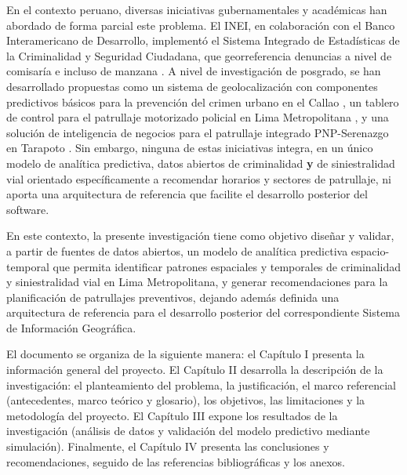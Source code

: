 \documentclass[12pt,letterpaper]{report}
\begin{document}
En el contexto peruano, diversas iniciativas gubernamentales y acad\'emicas han abordado de forma parcial este problema. El INEI, en colaboraci\'on con el Banco Interamericano de Desarrollo, implement\'o el Sistema Integrado de Estad\'isticas de la Criminalidad y Seguridad Ciudadana, que georreferencia denuncias a nivel de comisar\'ia e incluso de manzana \citep{bid2020buenapractica}. A nivel de investigaci\'on de posgrado, se han desarrollado propuestas como un sistema de geolocalizaci\'on con componentes predictivos b\'asicos para la prevenci\'on del crimen urbano en el Callao \citep{talla2025geolocalizacion}, un tablero de control para el patrullaje motorizado policial en Lima Metropolitana \citep{sanchezguevara2022tabcop}, y una soluci\'on de inteligencia de negocios para el patrullaje integrado PNP-Serenazgo en Tarapoto \citep{flores2017patrullaje}. Sin embargo, ninguna de estas iniciativas integra, en un \'unico modelo de analítica predictiva, datos abiertos de criminalidad \textbf{y} de siniestralidad vial orientado espec\'ificamente a recomendar horarios y sectores de patrullaje, ni aporta una arquitectura de referencia que facilite el desarrollo posterior del software.

En este contexto, la presente investigaci\'on tiene como objetivo dise\~nar y validar, a partir de fuentes de datos abiertos, un modelo de analítica predictiva espacio-temporal que permita identificar patrones espaciales y temporales de criminalidad y siniestralidad vial en Lima Metropolitana, y generar recomendaciones para la planificaci\'on de patrullajes preventivos, dejando adem\'as definida una arquitectura de referencia para el desarrollo posterior del correspondiente Sistema de Informaci\'on Geogr\'afica.

El documento se organiza de la siguiente manera: el Cap\'itulo I presenta la informaci\'on general del proyecto. El Cap\'itulo II desarrolla la descripci\'on de la investigaci\'on: el planteamiento del problema, la justificaci\'on, el marco referencial (antecedentes, marco te\'orico y glosario), los objetivos, las limitaciones y la metodolog\'ia del proyecto. El Cap\'itulo III expone los resultados de la investigaci\'on (an\'alisis de datos y validaci\'on del modelo predictivo mediante simulaci\'on). Finalmente, el Cap\'itulo IV presenta las conclusiones y recomendaciones, seguido de las referencias bibliogr\'aficas y los anexos.

\newpage

\end{document}
